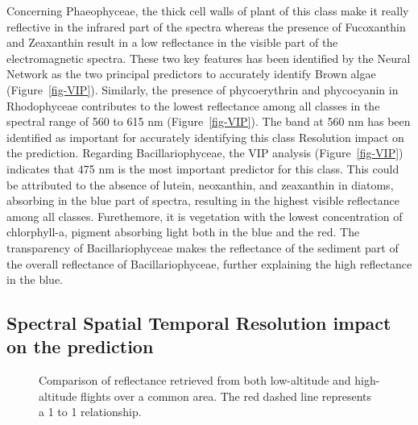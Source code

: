 \documentclass[
  number]{elsarticle}
\begin{document}
Concerning Phaeophyceae, the thick cell walls of plant of this class
make it really reflective in the infrared part of the spectra whereas
the presence of Fucoxanthin and Zeaxanthin result in a low reflectance
in the visible part of the electromagnetic spectra. These two key
features has been identified by the Neural Network as the two principal
predictors to accurately identify Brown algae (Figure~\ref{fig-VIP}).
Similarly, the presence of phycoerythrin and phycocyanin in Rhodophyceae
contributes to the lowest reflectance among all classes in the spectral
range of 560 to 615 nm (Figure~\ref{fig-VIP}). The band at 560 nm has
been identified as important for accurately identifying this class
Resolution impact on the prediction. Regarding Bacillariophyceae, the
VIP analysis (Figure~\ref{fig-VIP}) indicates that 475 nm is the most
important predictor for this class. This could be attributed to the
absence of lutein, neoxanthin, and zeaxanthin in diatoms, absorbing in
the blue part of spectra, resulting in the highest visible reflectance
among all classes. Furethemore, it is vegetation with the lowest
concentration of chlorphyll-a, pigment absorbing light both in the blue
and the red. The transparency of Bacillariophyceae makes the reflectance
of the sediment part of the overall reflectance of Bacillariophyceae,
further explaining the high reflectance in the blue.

\subsection{Spectral Spatial Temporal Resolution impact on the
prediction}\label{spectral-spatial-temporal-resolution-impact-on-the-prediction}

\label{cell-fig-CompareRef}
\begin{figure}[H]


\caption{\label{fig-CompareRef}Comparison of reflectance retrieved from
both low-altitude and high-altitude flights over a common area. The red
dashed line represents a 1 to 1 relationship.}

\end{figure}%
\end{document}
